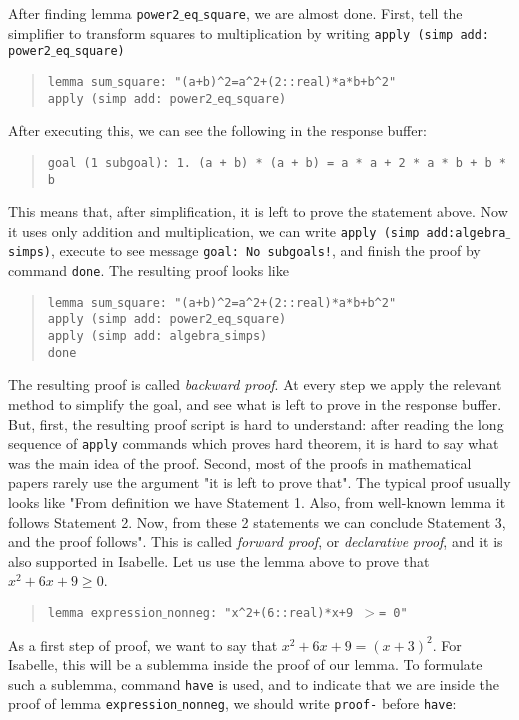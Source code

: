\documentclass[11pt]{article}
\newcommand{\ind}{\phantom{a}\quad}
\newcommand{\prog}[1]{\par\noindent\begin{quote}#1\end{quote}\par\noindent}
\begin{document}
After finding lemma {\tt power2$\_$eq$\_$square}, we are almost done. First, tell the simplifier to transform squares to multiplication by writing {\tt apply (simp add: power2$\_$eq$\_$square)}

\prog{\tt lemma sum$\_$square: "(a+b)\^{}2=a\^{}2+(2::real)*a*b+b\^{}2"\\
\ind apply (simp add:~power2$\_$eq$\_$square)}%

After executing this, we can see the following in the response buffer:

\prog{\tt goal (1 subgoal): 1. (a + b) * (a + b) = a * a + 2 * a * b + b * b}%

This means that, after simplification, it is left to prove the statement above. Now it uses only addition and multiplication, we can write {\tt apply (simp add:algebra$\_$simps)}, execute to see message {\tt goal:~No subgoals!}, and finish the proof by command {\tt done}. The resulting proof looks like

\prog{\tt lemma sum$\_$square: "(a+b)\^{}2=a\^{}2+(2::real)*a*b+b\^{}2"\\
\ind apply (simp add:~power2$\_$eq$\_$square)\\
\ind apply (simp add:~algebra$\_$simps)\\
done}%

The resulting proof is called \emph{backward proof}. At every step we apply the relevant method to simplify the goal, and see what is left to prove in the response buffer. But, first, the resulting proof script is hard to understand: after reading the long sequence of {\tt apply} commands which proves hard theorem, it is hard to say what was the main idea of the proof. Second, most of the proofs in mathematical papers rarely use the argument "it is left to prove that". The typical proof usually looks like "From definition we have Statement 1. Also, from well-known lemma it follows Statement 2. Now, from these 2 statements we can conclude Statement 3, and the proof follows". This is called \emph{forward proof}, or \emph{declarative proof}, and it is also supported in Isabelle. Let us use the lemma above to prove that $x^2+6x+9\geq 0$.

\prog{\tt lemma expression$\_$nonneg: "x\^{}2+(6::real)*x+9 $>$= 0"}%

As a first step of proof, we want to say that $x^2+6x+9=(x+3)^2$. For Isabelle, this will be a sublemma inside the proof of our lemma. To formulate such a sublemma, command {\tt have} is used, and to indicate that we are inside the proof of lemma {\tt expression$\_$nonneg}, we should write {\tt proof-} before {\tt have}:
\end{document}
